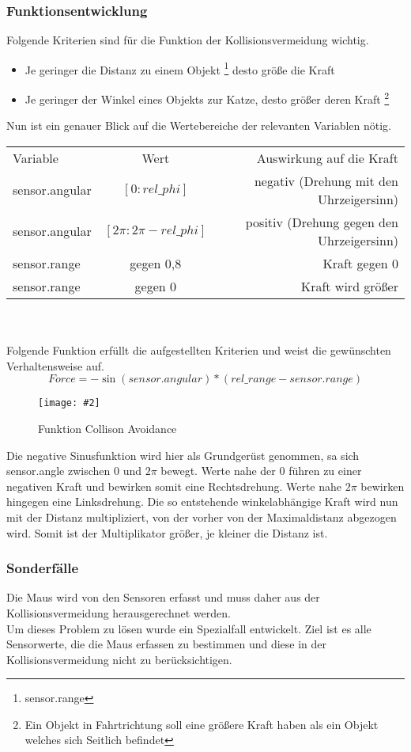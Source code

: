 \documentclass[
a4paper,     %
12pt         %
]{scrartcl}  %
\newcommand{\mygraphics}[3]{
\begin{figure}[!h]
  \begin{center}
    \texttt{[image: \#2]} \\
    \caption{#3}\label{fig:#2}
  \end{center}
\end{figure}

}
\begin{document}
\subsubsection{Funktionsentwicklung}
\label{collision}
Folgende Kriterien sind für die Funktion der Kollisionsvermeidung wichtig.
\begin{itemize}
\item Je geringer die Distanz zu einem Objekt \footnote {sensor.range} desto größe die Kraft
\item Je geringer der Winkel eines Objekts zur Katze, desto größer deren Kraft \footnote{Ein Objekt in Fahrtrichtung soll eine größere Kraft haben als ein Objekt welches sich Seitlich befindet}
\end{itemize}
Nun ist ein genauer Blick auf die Wertebereiche der relevanten Variablen nötig.\\
\begin{tabular}[h]{|l|c|r|}
\hline
Variable & Wert & Auswirkung auf die Kraft \\
sensor.angular & $[0 : rel\_phi]$ & negativ (Drehung mit den Uhrzeigersinn) \\
sensor.angular & $[2\pi : 2\pi-rel\_phi]$ & positiv (Drehung gegen den Uhrzeigersinn) \\
sensor.range & gegen 0,8  & Kraft gegen 0 \\
sensor.range & gegen 0 & Kraft wird größer \\
\hline
\end{tabular}
\\
\\
Folgende Funktion erfüllt die aufgestellten Kriterien und weist die gewünschten Verhaltensweise auf.
\[ Force= -\sin(sensor.angular) * (rel\_range-sensor.range) \]
\mygraphics{0.7\textwidth}{Kollision.png}{Funktion
Collison Avoidance}
\noindent Die negative Sinusfunktion wird hier als Grundgerüst genommen, sa sich sensor.angle zwischen 0 und $2\pi$ bewegt. Werte nahe der 0 führen zu einer negativen Kraft und bewirken somit eine Rechtsdrehung. Werte nahe $2\pi $ bewirken hingegen eine Linksdrehung. Die so entstehende winkelabhängige Kraft wird  nun mit der Distanz multipliziert, von der vorher von der Maximaldistanz abgezogen wird. Somit ist der Multiplikator größer, je kleiner die Distanz ist.
\subsubsection{Sonderfälle}
Die Maus wird von den Sensoren erfasst und muss daher aus der Kollisionsvermeidung herausgerechnet werden.\\
Um dieses Problem zu lösen wurde ein Spezialfall entwickelt.
Ziel ist es alle Sensorwerte, die die Maus erfassen zu bestimmen und diese in der Kollisionsvermeidung nicht  zu berücksichtigen. \\
\end{document}
